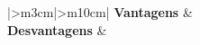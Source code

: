 \begin{longtable}{{|>{\centering\arraybackslash}m{3cm}|>{\centering\arraybackslash}m{10cm}|}}
\textbf{Vantagens}                                          &                                                                                                                                                                                                                                                      \\ \hline
\textbf{Desvantagens}                                       &                                                                                                                                                                                                                                                      \\ \hline

\end{longtable}



